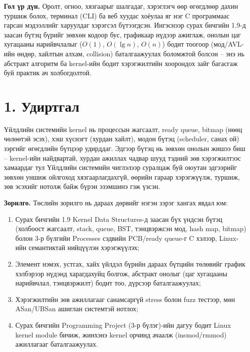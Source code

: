 \textbf{Гол үр дүн.} Оролт, огноо, хязгаарыг шалгадаг, хэрэглэгч өөр өгөгдлөөр дахин туршиж болох, терминал (CLI) ба веб хуудас хоёулаа яг нэг C программаас гарсан мэдээллийг харуулдаг хэрэгсэл бүтээгдсэн. Ингэснээр сурах бичгийн 1.9-д заасан бүтэц бүрийг зөвхөн кодоор бус, графикаар нүдээр ажиглаж, онолын цаг хугацааны нарийвчлалыг ($O(1)$, $O(\lg n)$, $O(n)$) бодит тоогоор (мод/AVL-ийн өндөр, хайлтын алхам, collision) баталгаажуулах боломжтой болсон -- энэ нь абстракт алгоритм ба kernel-ийн бодит хэрэгжилтийн хоорондох зайг багасгаж буй практик ач холбогдолтой.

\section*{1. Удиртгал}

Үйлдлийн системийн kernel нь процессын жагсаалт, ready queue, bitmap (нөөц чөлөөтэй эсэх), хэш хүснэгт (хурдан хайлт), модон бүтэц (scheduler, санах ой) зэргийг өгөгдлийн бүтцээр удирддаг. Эдгээр бүтэц нь зөвхөн онолын жишээ биш -- kernel-ийн найдвартай, хурдан ажиллах чадвар шууд тэдний зөв хэрэгжилтээс хамаардаг тул Үйлдлийн системийн чиглэлээр суралцаж буй оюутан эдгээрийг зөвхөн уншиж ойлгоход хязгаарлагдахгүй, өөрийн гараар хэрэгжүүлж, туршиж, зөв эсэхийг нотолж байж бүрэн эзэмшинэ гэж үзсэн.

\textbf{Зорилго.} Төслийн зорилго нь дараах дөрвийг нэгэн зэрэг хангах явдал юм:
\begin{enumerate}[leftmargin=22pt,itemsep=2pt,topsep=2pt]
  \item Сурах бичгийн 1.9 Kernel Data Structures-д заасан бүх үндсэн бүтэц (холбоост жагсаалт, stack, queue, BST, тэнцвэржсэн мод, hash map, bitmap) болон 3-р бүлгийн Processes сэдвийн PCB/ready queue-г C хэлээр, Linux-ийн  семантиктай нийцүүлэн хэрэгжүүлэх;
  \item Элемент нэмэх, устгах, хайх үйлдэл бүрийн дараах бүтцийн төлөвийг график хэлбэрээр нүдэнд харагдахуйц болгож, абстракт онолыг (цаг хугацааны нарийвчлал, тэнцвэржилт) бодит тоо, дүрсээр баталгаажуулах;
  \item Хэрэгжилтийн зөв ажиллагааг санамсаргүй stress болон fuzz тестээр, мөн ASan/UBSan ашиглан системтэй нотлох;
  \item Сурах бичгийн Programming Project (3-р бүлэг)-ийн дагуу бодит Linux kernel module бичиж, жинхэнэ kernel орчинд ачаалж (insmod/rmmod) ажиллагааг баталгаажуулах.
\end{enumerate}

